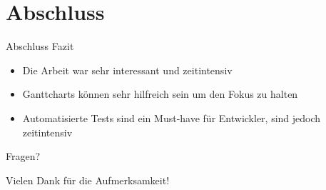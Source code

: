 \documentclass[12pt, aspectratio=1610]{beamer}
\begin{document}
\section{Abschluss}
\label{sec:orgdb433f2}
\begin{frame}[label={sec:org33a667a}]{Abschluss}
\alert{Fazit}
\begin{itemize}
\item <2-> Die Arbeit war sehr interessant und zeitintensiv
\item <3-> Ganttcharts können sehr hilfreich sein um den Fokus zu halten
\item <4-> Automatisierte Tests sind ein Must-have für Entwickler, sind jedoch zeitintensiv
\end{itemize}
\end{frame}

\begin{frame}[label={sec:org91d75ee}]{}
\alert{\huge{Fragen?}}
\end{frame}
\begin{frame}[label={sec:org1172673}]{}
\alert{\huge{Vielen Dank für die Aufmerksamkeit!}}
\end{frame}
\end{document}
